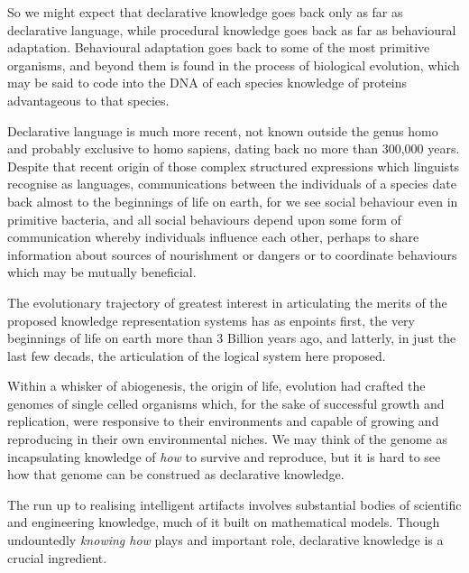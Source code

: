 So we might expect that declarative knowledge goes back only as far as declarative language, while procedural knowledge goes back as far as behavioural adaptation.
Behavioural adaptation goes back to some of the most primitive organisms, and beyond them is found in the process of biological evolution, which may be said to code into the DNA of each species knowledge of proteins advantageous to that species.

Declarative language is much more recent, not known outside the genus homo and probably exclusive to homo sapiens, dating back no more than 300,000 years.
Despite that recent origin of those complex structured expressions which linguists recognise as languages, communications between the individuals of a species date back almost to the beginnings of life on earth, for we see social behaviour even in primitive bacteria, and all social behaviours depend upon some form of communication whereby individuals influence each other, perhaps to share information about sources of nourishment or dangers or to coordinate behaviours which may be mutually beneficial.

The evolutionary trajectory of greatest interest in articulating the merits of the proposed knowledge representation systems has as enpoints first, the very beginnings of life on earth more than 3 Billion years ago, and latterly, in just the last few decads, the articulation of the logical system here proposed.

Within a whisker of abiogenesis, the origin of life, evolution had crafted the genomes of single celled organisms which, for the sake of successful growth and replication, were responsive to their environments and capable of growing and reproducing in their own environmental niches.
We may think of the genome as incapsulating knowledge of \emph{how} to survive and reproduce, but it is hard to see how that genome can be construed as declarative knowledge.

The run up to realising intelligent artifacts involves substantial bodies of scientific and engineering knowledge, much of it built on mathematical models.
Though undountedly \emph{knowing how} plays and important role, declarative knowledge is a crucial ingredient.
